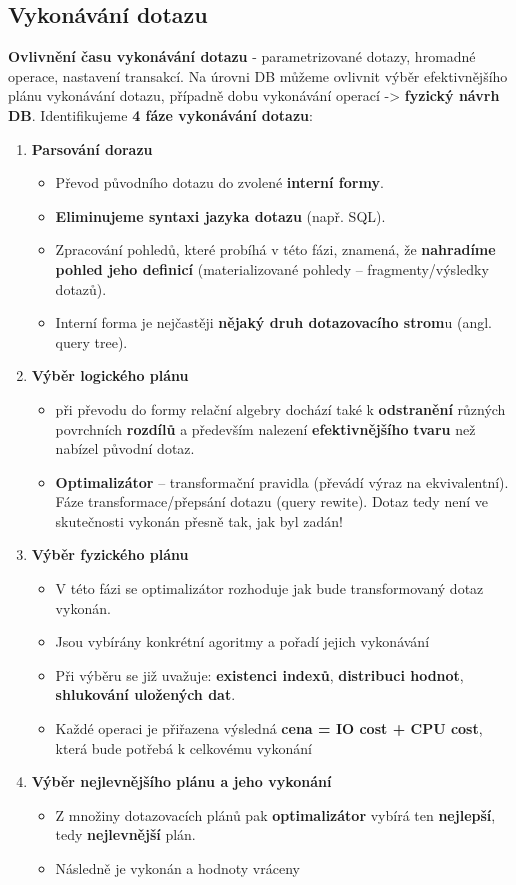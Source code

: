 \subsection{Vykonávání dotazu}
\textbf{Ovlivnění času vykonávání dotazu} - parametrizované dotazy, hromadné operace, nastavení transakcí. Na úrovni DB můžeme ovlivnit výběr efektivnějšího plánu vykonávání dotazu, případně dobu vykonávání operací -> \textbf{fyzický návrh DB}. Identifikujeme \textbf{4 fáze vykonávání dotazu}:

\begin{enumerate}
	\item \textbf{Parsování dorazu}
	\begin{itemize}
		\item Převod původního dotazu do zvolené \textbf{interní formy}.
		\item \textbf{Eliminujeme syntaxi jazyka dotazu} (např. SQL).
		\item Zpracování pohledů, které probíhá v této fázi, znamená, že \textbf{nahradíme pohled jeho definicí} (materializované pohledy -- fragmenty/výsledky dotazů).
		\item Interní forma je nejčastěji \textbf{nějaký druh dotazovacího strom}u (angl. query tree).
	\end{itemize}
	\item \textbf{Výběr logického plánu}
	\begin{itemize}
		\item při převodu do formy relační algebry dochází také k \textbf{odstranění} různých povrchních \textbf{rozdílů} a především nalezení \textbf{efektivnějšího} \textbf{tvaru} než nabízel původní dotaz.
		\item \textbf{Optimalizátor} – transformační pravidla (převádí výraz na ekvivalentní). Fáze transformace/přepsání dotazu (query rewite). Dotaz tedy není ve skutečnosti vykonán přesně tak, jak byl zadán! 
	\end{itemize}
	\item \textbf{Výběr fyzického plánu}
	\begin{itemize}
		\item V této fázi se optimalizátor rozhoduje jak bude transformovaný dotaz vykonán.
		\item Jsou vybírány konkrétní agoritmy a pořadí jejich vykonávání
		\item Při výběru se již uvažuje: \textbf{existenci indexů}, \textbf{distribuci hodnot}, \textbf{shlukování uložených dat}.
		\item Každé operaci je přiřazena výsledná \textbf{cena = IO cost + CPU cost}, která bude potřebá k celkovému vykonání
	\end{itemize}
	\item \textbf{Výběr nejlevnějšího plánu a jeho vykonání}
	\begin{itemize}		
		\item Z množiny dotazovacích plánů pak \textbf{optimalizátor} vybírá ten \textbf{nejlepší}, tedy \textbf{nejlevnější} plán.
		\item Následně je vykonán a hodnoty vráceny
	\end{itemize}
\end{enumerate}

